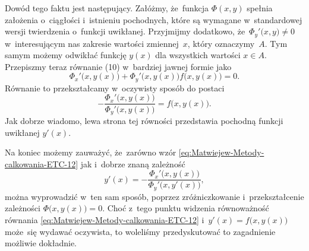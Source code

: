\documentclass[a4paper,11pt]{article}
\begin{document}
Dowód tego faktu jest następujący. Załóżmy, że~funkcja $\Phi( x, y )$ spełnia
założenia o~ciągłości i~istnieniu pochodnych, które są wymagane
w~standardowej wersji twierdzenia o~funkcji uwikłanej. Przyjmijmy dodatkowo,
że~$\Phi_{ y }'\big( x, y \big) \neq 0$ w~interesującym nas zakresie wartości
zmiennej~$x$, który oznaczymy~$A$. Tym samym możemy odwikłać funkcję
$y( x )$ dla wszystkich wartości $x \in A$. Przepiszmy teraz równanie (10)
w~bardziej jawnej formie jako
\begin{equation}
  \label{eq:Matwiejew-Metody-calkowania-ETC-12}
  \Phi_{ x }'\big( x, y( x ) \big) +
  \Phi_{ y }'\big( x, y( x ) \big) f\big( x, y( x ) \big) = 0.
\end{equation}
Równanie to przekształcamy w~oczywisty sposób do postaci
\begin{equation}
  \label{eq:Matwiejew-Metody-calkowania-ETC-13}
  -\frac{ \Phi_{ x }'\big( x, y( x ) \big) }
  { \Phi_{ y }'\big( x, y( x ) \big) } =
  f\big( x, y( x ) \big).
\end{equation}
Jak dobrze wiadomo, lewa strona tej równości przedstawia pochodną funkcji
uwikłanej $y'( x )$.

Na koniec możemy zauważyć, że~zarówno wzór
\eqref{eq:Matwiejew-Metody-calkowania-ETC-12} jak i~dobrze znaną zależność
\begin{equation}
  \label{eq:Matwiejew-Metody-calkowania-ETC-14}
  y'( x ) =
  -\frac{ \Phi_{ x }'\big( x, y( x ) \big) }{ \Phi_{ y }'\big( x, y'( x ) \big) },
\end{equation}
można wyprowadzić w~ten sam sposób, poprzez zróżniczkowanie
i~przekształcenie zależności $\Phi\big( x, y( x ) \big) = 0$. Choć z~tego
punktu widzenia równoważność równania
\eqref{eq:Matwiejew-Metody-calkowania-ETC-12}
i~$y'( x ) = f\big( x, y( x ) \big)$ może~się wydawać oczywista, to woleliśmy
przedyskutować to zagadnienie możliwie dokładnie.

\vspace{\VerSpaceFour}





\noindent
{}  \\

\vspace{\VerSpaceFour}









\newpage
\end{document}
